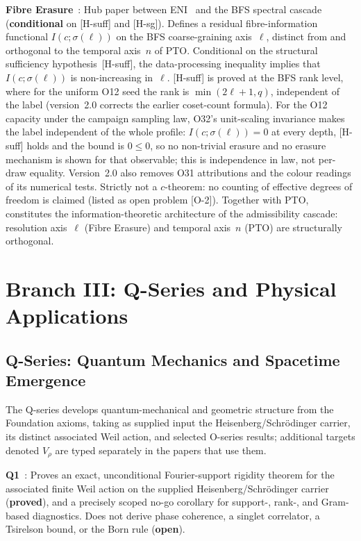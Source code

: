 \documentclass[11pt,a4paper]{article}
\newcommand{\sproved}{\textcolor{cproved}{\textbf{proved}}}
\newcommand{\sopen}{\textcolor{copen}{\textbf{open}}}
\newcommand{\scond}{\textcolor{ccond}{\textbf{conditional}}}
\begin{document}
    \textbf{Fibre Erasure}~\cite{Beau2026fe}: Hub paper between ENI~\cite{Beau2026l} and the BFS
    spectral cascade (\scond{} on [H-suff] and [H-sg]). Defines a residual fibre-information functional
    $I(c;\sigma(\ell))$ on the
    BFS coarse-graining axis~$\ell$, distinct from and orthogonal to the temporal axis~$n$ of PTO.
    Conditional on the structural sufficiency hypothesis~[H-suff], the data-processing inequality
    implies that $I(c;\sigma(\ell))$ is non-increasing in~$\ell$. [H-suff] is proved at the BFS rank
    level, where for the uniform O12 seed the rank is $\min(2\ell+1,q)$, independent of the label
    (version~2.0 corrects the earlier coset-count formula). For the O12 capacity under the campaign
    sampling law, O32's unit-scaling invariance makes the label independent of the whole profile:
    $I(c;\sigma(\ell)) = 0$ at every depth, [H-suff] holds and the bound is $0\leq0$, so no
    non-trivial erasure and no erasure mechanism is shown for that observable; this is independence in
    law, not per-draw equality. Version~2.0 also removes O31 attributions and the colour readings of
    its numerical tests.
    Strictly not a $c$-theorem: no counting of effective degrees of freedom is claimed (listed
    as open problem [O-2]). Together with PTO, constitutes the information-theoretic architecture
    of the admissibility cascade: resolution axis~$\ell$ (Fibre Erasure) and temporal axis~$n$
    (PTO) are structurally orthogonal.

  \section{Branch III: Q-Series and Physical Applications}
  \label{sec:qseries}

  \subsection{Q-Series: Quantum Mechanics and Spacetime Emergence}

    The Q-series develops quantum-mechanical and geometric structure from the Foundation axioms,
    taking as supplied input the Heisenberg/Schr\"odinger carrier, its distinct associated Weil
    action, and selected O-series results; additional targets denoted $V_\rho$ are typed separately
    in the papers that use them.

    \textbf{Q1}~\cite{Beau2026q1}: Proves an exact, unconditional Fourier-support rigidity
    theorem for the associated finite Weil action on the supplied Heisenberg/Schr\"odinger
    carrier (\sproved), and a
    precisely scoped no-go corollary for support-, rank-, and Gram-based diagnostics. Does not
    derive phase coherence, a singlet correlator, a Tsirelson bound, or the Born rule (\sopen).
\end{document}
